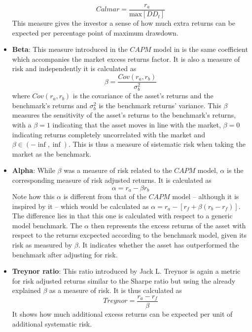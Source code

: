 \begin{itemize}
    \begin{equation}
        Calmar=\frac{r_a}{\text{max}\left[DD_t\right]}
    \end{equation}
    This measure gives the investor a sense of how much extra returns can be expected per percentage point of maximum drawdown. 
    \item \textbf{Beta}: This measure introduced in the $CAPM$ model in \cite{sharpe_1964} is the same coefficient which accompanies the market excess returns factor. It is also a measure of risk and independently it is calculated as 
    \begin{equation}
        \beta=\frac{Cov\left(r_a,r_b\right)}{\sigma^2_b}
    \end{equation}
    where $Cov\left(r_a,r_b\right)$ is the covariance of the asset's returns and the benchmark's returns and $\sigma^2_b$ is the benchmark returns' variance. This $\beta$ measures the sensitivity of the asset's returns to the benchmark's returns, with a $\beta=1$ indicating that the asset moves in line with the market, $\beta=0$ indicating returns completely uncorrelated with the market and $\beta \in \left(-\inf,\inf\right)$. This is thus a measure of sistematic risk when taking the market as the benchmark.
    \item \textbf{Alpha}: While $\beta$ was a measure of risk related to the $CAPM$ model, $\alpha$ is the corresponding measure of risk adjusted returns. It is calculated as
    \begin{equation}
        \alpha=r_a-\beta r_b
    \end{equation}
    Note how this $\alpha$ is different from that of the $CAPM$ model -- although it is inspired by it -- which would be calculated as $\alpha=r_a-\left[r_f+\beta\left(r_b-r_f\right)\right]$. The difference lies in that this one is calculated with respect to a generic model benchmark. The $\alpha$ then represents the excess returns of the asset with respect to the returns excpected according to the benchmark model, given its risk as measured by $\beta$. It indicates whether the asset has outperformed the benchmark after adjusting for risk.
    \item \textbf{Treynor ratio}: This ratio introduced by Jack L. Treynor is again a metric for risk adjusted returns similar to the Sharpe ratio but using the already explained $\beta$ as a measure of risk. It is thus calculated as 
    \begin{equation}
        Treynor=\frac{r_a-r_f}{\beta}
    \end{equation}
    It shows how much additional excess returns can be expected per unit of additional systematic risk.  
\end{itemize}